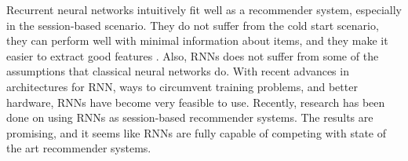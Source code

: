 
Recurrent neural networks intuitively fit well as a recommender system, especially in the session-based scenario. They do not suffer from the cold start scenario, they can perform well with minimal information about items, and they make it easier to extract good features \cite{ZALANDO:understanding-consumer-histories}. Also, RNNs does not suffer from some of the assumptions that classical neural networks do. With recent advances in architectures for RNN, ways to circumvent training problems, and better hardware, RNNs have become very feasible to use. Recently, research has been done on using RNNs as session-based recommender systems. The results are promising, and it seems like RNNs are fully capable of competing with state of the art recommender systems.






